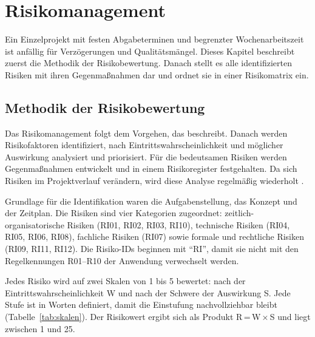 \section{Risikomanagement}\label{sec:risikomanagement}
Ein Einzelprojekt mit festen Abgabeterminen und begrenzter Wochenarbeitszeit ist anfällig für Verzögerungen und Qualitätsmängel. Dieses Kapitel beschreibt zuerst die Methodik der Risikobewertung. Danach stellt es alle identifizierten Risiken mit ihren Gegenmaßnahmen dar und ordnet sie in einer Risikomatrix ein.

\subsection{Methodik der Risikobewertung}
Das Risikomanagement folgt dem Vorgehen, das \textcite[S.~9-9]{swebok2026} beschreibt. Danach werden Risikofaktoren identifiziert, nach Eintrittswahrscheinlichkeit und möglicher Auswirkung analysiert und priorisiert. Für die bedeutsamen Risiken werden Gegenmaßnahmen entwickelt und in einem Risikoregister festgehalten. Da sich Risiken im Projektverlauf verändern, wird diese Analyse regelmäßig wiederholt \parencite[S.~9-9]{swebok2026}.

Grundlage für die Identifikation waren die Aufgabenstellung, das Konzept und der Zeitplan. Die Risiken sind vier Kategorien zugeordnet: zeitlich-organisatorische Risiken (RI01, RI02, RI03, RI10), technische Risiken (RI04, RI05, RI06, RI08), fachliche Risiken (RI07) sowie formale und rechtliche Risiken (RI09, RI11, RI12). Die Risiko-IDs beginnen mit \enquote{RI}, damit sie nicht mit den Regelkennungen R01--R10 der Anwendung verwechselt werden.

Jedes Risiko wird auf zwei Skalen von 1 bis 5 bewertet: nach der Eintrittswahrscheinlichkeit W und nach der Schwere der Auswirkung S. Jede Stufe ist in Worten definiert, damit die Einstufung nachvollziehbar bleibt (Tabelle~\ref{tab:skalen}). Der Risikowert ergibt sich als Produkt R\,=\,W\,×\,S und liegt zwischen 1 und 25.

